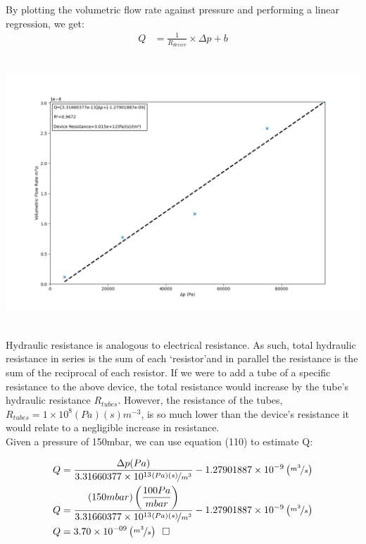 \documentclass[titlepage]{article}
\begin{document}
\newpage
\noindent By plotting the volumetric flow rate against pressure and performing a linear regression, we get: 
\begin{align}
    Q &= \displaystyle\frac{1}{R_{device}}\times{\Delta{p}}+b
\end{align}
\begin{center}
    \includegraphics[width=15cm, height=10cm]{rhyd.png}
\end{center}
\noindent Hydraulic resistance is analogous to electrical resistance. As such, total hydraulic resistance in series is the sum of each `resistor'and in parallel the resistance is the sum of the reciprocal of each resistor. If we were to add a tube of a specific resistance to the above device, the total resistance would increase by the tube's hydraulic resistance $R_{tubes}$. However, the resistance of the tubes, $R_{tubes}=1\times{10^8}\left(Pa\right)\left(s\right){m^{-3}}$, is so much lower than the device's resistance it would relate to a negligible increase in resistance. \\

\noindent Given a pressure of 150mbar, we can use equation (110) to estimate Q: 

\begin{align}
    Q &= \displaystyle\frac{\Delta{p}(Pa)}{3.31660377\times{10^{13}}\nicefrac{(Pa)(s)}{m^3}} - 1.27901887\times{10^{-9}}\left(\displaystyle\nicefrac{m^3}{s}\right)\\
    Q &= \displaystyle\frac{\left(150mbar\right)\left(\displaystyle\frac{100Pa}{mbar}\right)}{3.31660377\times{10^{13}}\nicefrac{(Pa)(s)}{m^3}} - 1.27901887\times{10^{-9}}\left(\displaystyle\nicefrac{m^3}{s}\right) \\
    Q &= 3.70\times{10^{-09}}\left(\displaystyle\nicefrac{m^3}{s}\right)\hspace*{5pt}\square
\end{align}
\end{document}
